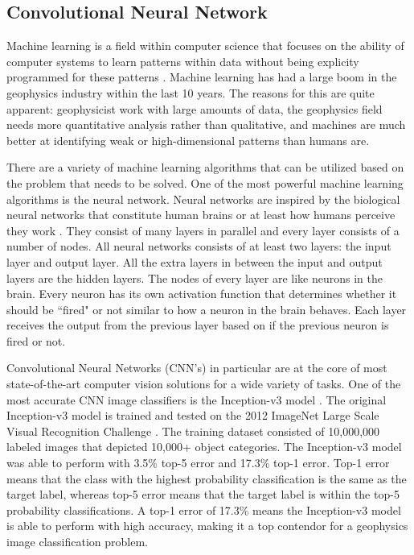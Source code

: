 \subsection{Convolutional Neural Network}
Machine learning is a field within computer science that focuses on the ability of computer systems to learn patterns within data without being explicity programmed for these patterns \citep{samuel1959some}. Machine learning has had a large boom in the geophysics industry within the last 10 years. The reasons for this are quite apparent: geophysicist work with large amounts of data, the geophysics field needs more quantitative analysis rather than qualitative, and machines are much better at identifying weak or high-dimensional patterns than humans are.

There are a variety of machine learning algorithms that can be utilized based on the problem that needs to be solved. One of the most powerful machine learning algorithms is the neural network. Neural networks are inspired by the biological neural networks that constitute human brains or at least how humans perceive they work \citep{Gerven2018}. They consist of many layers in parallel and every layer consists of a number of nodes. All neural networks consists of at least two layers: the input layer and output layer. All the extra layers in between the input and output layers are the hidden layers. The nodes of every layer are like neurons in the brain. Every neuron has its own activation function that determines whether it should be ``fired" or not similar to how a neuron in the brain behaves. Each layer receives the output from the previous layer based on if the previous neuron is fired or not.

Convolutional Neural Networks (CNN's) in particular are at the core of most state-of-the-art computer vision solutions for a wide variety of tasks. One of the most accurate CNN image classifiers is the Inception-v3 model \citep{Szegedy2015}. The original Inception-v3 model is trained and tested on the 2012 ImageNet Large Scale Visual Recognition Challenge \citep{ILSVRC15}. The training dataset consisted of 10,000,000 labeled images that depicted 10,000+ object categories. The Inception-v3 model was able to perform with 3.5\% top-5 error and 17.3\% top-1 error. Top-1 error means that the class with the highest probability classification is the same as the target label, whereas top-5 error means that the target label is within the top-5 probability classifications. A top-1 error of 17.3\% means the Inception-v3 model is able to perform with high accuracy, making it a top contendor for a geophysics image classification problem.

